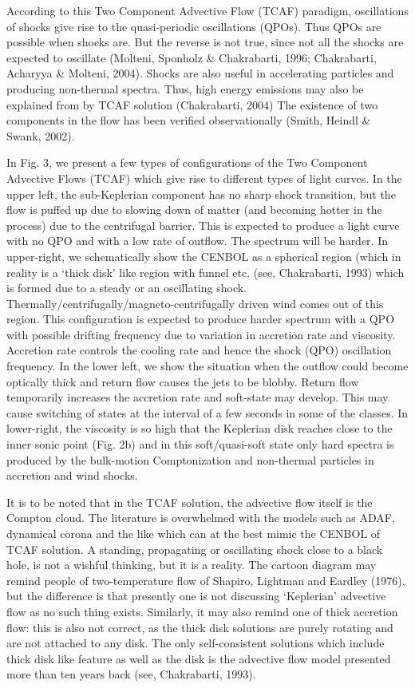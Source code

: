 \documentclass[referee]{cjaa}           %
\begin{document}
According to this Two Component Advective Flow (TCAF) paradigm, oscillations of shocks give rise 
to the quasi-periodic oscillations (QPOs). Thus QPOs are possible when shocks are. But the 
reverse is not true, since not all the shocks are expected to oscillate (Molteni, Sponholz \& Chakrabarti, 1996;
Chakrabarti, Acharyya \& Molteni, 2004). Shocks are also useful in accelerating particles and producing 
non-thermal spectra. Thus, high energy emissions may also be explained from by TCAF solution (Chakrabarti, 2004)
The existence of two components in the flow has been verified observationally (Smith, Heindl \& Swank, 2002). 

In Fig. 3, we present a few types of configurations of the Two Component Advective Flows (TCAF)
which give rise to different types of light curves. In the upper left, the sub-Keplerian component has no sharp
shock transition, but the flow is puffed up due to slowing down of matter (and becoming hotter
in the process) due to the  centrifugal barrier. This is expected to 
produce a light curve with no QPO and with a low rate of outflow. The spectrum will be harder. In upper-right,
we schematically show the CENBOL as a spherical region (which in reality is a `thick disk' like region
with funnel etc. (see, Chakrabarti, 1993) which is formed due to a steady or an oscillating shock. 
Thermally/centrifugally/magneto-centrifugally driven wind comes out of this region.  This configuration is
expected to produce harder spectrum with a QPO with possible drifting frequency due to variation in accretion rate 
and viscosity. Accretion rate controls the cooling rate and hence the shock (QPO) oscillation frequency.
In the lower left, we show the situation when the outflow could become optically thick and return flow 
causes the jets to be blobby. Return flow temporarily increases the accretion rate and soft-state
may develop. This may cause switching of states at the interval of a few seconds in some of the classes.
In lower-right, the viscosity is so high that the Keplerian disk reaches close to the inner sonic point (Fig. 2b)
and in this soft/quasi-soft state only hard spectra is produced by the bulk-motion Comptonization and non-thermal
particles in accretion and wind shocks.

It is to be noted that in the TCAF solution, the advective flow itself is the Compton cloud.
The literature is overwhelmed with the models such as ADAF, dynamical corona and the like 
which can at the best mimic the CENBOL of TCAF solution. A standing, propagating or oscillating 
shock close to a black hole, is not a wishful thinking, but it is a reality. The cartoon diagram may remind 
people of two-temperature flow of Shapiro, Lightman and Eardley (1976), but the difference is that presently
one is not discussing `Keplerian' advective flow as no such thing exists. Similarly, it may also remind
one of thick accretion flow: this is also not correct, as the thick disk solutions are purely rotating
and are not attached to any disk. The only self-consistent solutions which include thick disk like 
feature as well as the disk is the advective flow model presented more than ten years back (see, Chakrabarti, 1993).
\end{document}
